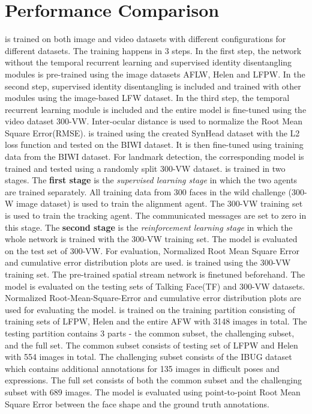 \documentclass{llncs}
\begin{document}
\section{Performance Comparison}
\cite{rednet} is trained on both image and video datasets with different configurations for different datasets. The training happens in 3 steps. In the first step, the network without the temporal recurrent learning and supervised identity disentangling modules is pre-trained using the image datasets AFLW, Helen and LFPW. In the second step, supervised identity disentangling is included and trained with other modules using the image-based LFW dataset. In the third step, the temporal recurrent learning module is included and the entire model is fine-tuned using the video dataset 300-VW. Inter-ocular distance is used to normalize the Root Mean Square Error(RMSE). \cite{dynamic_facial_analysis} is trained using the created SynHead dataset with the L2 loss function and tested on the BIWI dataset. It is then fine-tuned using training data from the BIWI dataset. For landmark detection, the corresponding model is trained and tested using a randomly split 300-VW dataset. \cite{dadrl} is trained in two stages. The \textbf{first stage} is the \textit{supervised learning stage} in which the two agents are trained separately. All training data from 300 faces in the wild challenge (300-W image dataset) is used to train the alignment agent. The 300-VW training set is used to train the tracking agent. The communicated messages are set to zero in this stage. The \textbf{second stage} is the \textit{reinforcement learning stage} in which the whole network is trained with the 300-VW training set. The model is evaluated on the test set of 300-VW. For evaluation, Normalized Root Mean Square Error and cumulative error distribution plots are used. \cite{tstn} is trained using the 300-VW training set. The pre-trained spatial stream network is finetuned beforehand. The model is evaluated on the testing sets of Talking Face(TF) and 300-VW datasets. Normalized Root-Mean-Square-Error and cumulative error distribution plots are used for evaluating the model. \cite{farn} is trained on the training partition consisting of training sets of LFPW, Helen and the entire AFW with 3148 images in total. The testing partition contains 3 parts - the common subset, the challenging subset, and the full set. The common subset consists of testing set of LFPW and Helen with 554 images in total. The challenging subset consists of the IBUG dataset which contains additional annotations for 135 images in difficult poses and expressions. The full set consists of both the common subset and the challenging subset with 689 images. The model is evaluated using point-to-point Root Mean Square Error between the face shape and the ground truth annotations.\\
\end{document}
